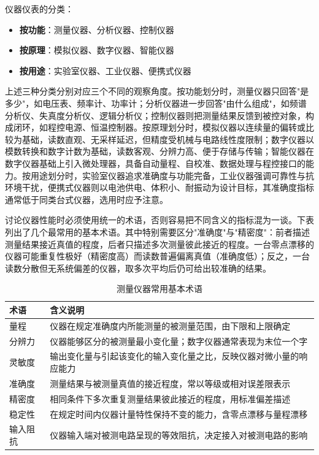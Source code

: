 仪器仪表的分类：
\begin{itemize}
    \item \textbf{按功能}：测量仪器、分析仪器、控制仪器
    \item \textbf{按原理}：模拟仪器、数字仪器、智能仪器
    \item \textbf{按用途}：实验室仪器、工业仪器、便携式仪器
\end{itemize}

上述三种分类分别对应三个不同的观察角度。按功能划分时，测量仪器只回答"是多少"，如电压表、频率计、功率计；分析仪器进一步回答"由什么组成"，如频谱分析仪、失真度分析仪、逻辑分析仪；控制仪器则把测量结果反馈到被控对象，构成闭环，如程控电源、恒温控制器。按原理划分时，模拟仪器以连续量的偏转或比较为基础，读数直观、无采样延迟，但精度受机械与电路线性度限制；数字仪器以模数转换和数字计数为基础，读数客观、分辨力高、便于存储与传输；智能仪器在数字仪器基础上引入微处理器，具备自动量程、自校准、数据处理与程控接口的能力。按用途划分时，实验室仪器追求准确度与功能完备，工业仪器强调可靠性与抗环境干扰，便携式仪器则以电池供电、体积小、耐振动为设计目标，其准确度指标通常低于同类台式仪器，选用时应予注意。

讨论仪器性能时必须使用统一的术语，否则容易把不同含义的指标混为一谈。下表列出了几个最常用的基本术语。其中特别需要区分"准确度"与"精密度"：前者描述测量结果接近真值的程度，后者只描述多次测量彼此接近的程度。一台零点漂移的仪器可能重复性极好（精密度高）而读数普遍偏离真值（准确度低）；反之，一台读数分散但无系统偏差的仪器，取多次平均后仍可给出较准确的结果。

\begin{table}[htbp]
\centering
\caption{测量仪器常用基本术语}
\begin{tabular}{|p{2.6cm}|p{10.4cm}|}
\hline
\textbf{术语} & \textbf{含义说明} \\
\hline
量程 & 仪器在规定准确度内所能测量的被测量范围，由下限和上限确定 \\
\hline
分辨力 & 仪器能够区分的被测量最小变化量；数字仪器通常表现为末位一个字 \\
\hline
灵敏度 & 输出变化量与引起该变化的输入变化量之比，反映仪器对微小量的响应能力 \\
\hline
准确度 & 测量结果与被测量真值的接近程度，常以等级或相对误差限表示 \\
\hline
精密度 & 相同条件下多次重复测量结果彼此接近的程度，用标准偏差描述 \\
\hline
稳定性 & 在规定时间内仪器计量特性保持不变的能力，含零点漂移与量程漂移 \\
\hline
输入阻抗 & 仪器输入端对被测电路呈现的等效阻抗，决定接入对被测电路的影响 \\
\hline
\end{tabular}
\end{table}

